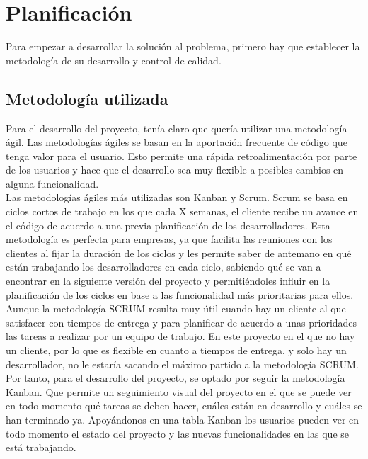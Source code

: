 \chapter{Planificación}
Para empezar a desarrollar la solución al problema, primero hay que establecer la metodología de su desarrollo y
control de calidad.\\

\section{Metodología utilizada}
Para el desarrollo del proyecto, tenía claro que quería utilizar una metodología ágil\cite{agile}. Las metodologías
ágiles se basan en la aportación frecuente de código que tenga valor para el usuario. Esto permite una rápida
retroalimentación por parte de los usuarios y hace que el desarrollo sea muy flexible a posibles cambios en alguna
funcionalidad.\\

Las metodologías ágiles más utilizadas son Kanban y Scrum. Scrum se basa en ciclos cortos de trabajo en los que cada X
semanas, el cliente recibe un avance en el código de acuerdo a una previa planificación de los desarrolladores. Esta
metodología es perfecta para empresas, ya que facilita las reuniones con los clientes al fijar la duración de los
ciclos y les permite saber de antemano en qué están trabajando los desarrolladores en cada ciclo, sabiendo qué se van
a encontrar en la siguiente versión del proyecto y permitiéndoles influir en la planificación de los ciclos en base a
las funcionalidad más prioritarias para ellos. \\

Aunque la metodología SCRUM resulta muy útil cuando hay un cliente al que satisfacer con tiempos de entrega y para
planificar de acuerdo a unas prioridades las tareas a realizar por un equipo de trabajo. En este proyecto en el que no
hay un cliente, por lo que es flexible en cuanto a tiempos de entrega, y solo hay un desarrollador, no le estaría
sacando el máximo partido a la metodología SCRUM.\\

Por tanto, para el desarrollo del proyecto, se optado por seguir la metodología Kanban. Que permite un seguimiento
visual del proyecto en el que se puede ver en todo momento qué tareas se deben hacer, cuáles están en desarrollo y
cuáles se han terminado ya. Apoyándonos en una tabla Kanban los usuarios pueden ver en todo momento el estado del
proyecto y las nuevas funcionalidades en las que se está trabajando. \\

